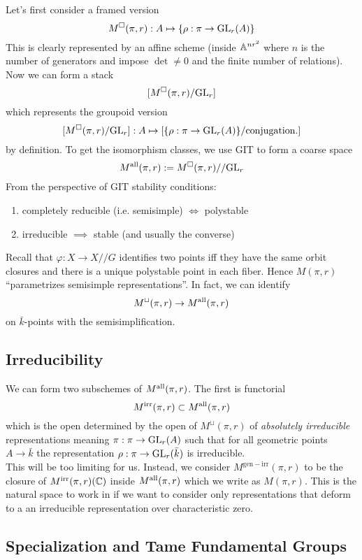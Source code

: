 \documentclass[12pt]{article}
\begin{document}
Let's first consider a framed version
\[ M^{\square}(\pi, r) : A \mapsto \{ \rho : \pi \to \mathrm{GL}_r(A) \} \]
This is clearly represented by an affine scheme (inside $\mathbb{A}^{nr^2}$ where $n$ is the number of generators and impose $\det \neq 0$ and the finite number of relations). Now we can form a stack
\[ [M^{\square}(\pi, r) / \mathrm{GL}_r] \]
which represents the groupoid version
\[ [M^{\square}(\pi, r) / \mathrm{GL}_r] : A \mapsto [\{ \rho : \pi \to \mathrm{GL}_r(A) \} / \text{conjugation}.] \]
by definition. To get the isomorphism classes, we use GIT to form a coarse space
\[ M^{\mathrm{all}}(\pi, r) := M^{\square}(\pi, r) // \mathrm{GL}_r \]
From the perspective of GIT stability conditions:
\begin{enumerate}
\item completely reducible (i.e. semisimple) $\iff$ polystable
\item irreducible $\implies$ stable (and usually the converse)
\end{enumerate}
Recall that $\varphi : X \to X // G$ identifies two points iff they have the same orbit closures and there is a unique polystable point in each fiber. Hence $M(\pi, r)$ ``parametrizes semisimple representations''. In fact, we can identify 
\[ M^{\sqcup}(\pi, r) \to M^{\mathrm{all}}(\pi, r) \]
on $\bar{k}$-points with the semisimplification. 

\subsection{Irreducibility}

\newcommand{\irr}{\mathrm{irr}}

We can form two subschemes of $M^{\mathrm{all}}(\pi, r)$. The first is functorial
\[ M^{\irr}(\pi, r) \subset M^{\all}(\pi, r) \]
which is the open determined by the open of $M^{\sqcup}(\pi, r)$ of \textit{absolutely irreducible} representations meaning $\pi : \pi \to \mathrm{GL}_r(A)$ such that for all geometric points $A \to \bar{k}$ the representation $\rho : \pi \to \mathrm{GL}_r(\bar{k})$ is irreducible. 
\bigskip\\
This will be too limiting for us. Instead, we consider $M^{\mathrm{gen-irr}}(\pi, r)$ to be the closure of $M^{\irr}(\pi, r)(\CC)$ inside $M^{\mathrm{all}}(\pi, r)$ which we write as $M(\pi, r)$. This is the natural space to work in if we want to consider only representations that deform to a an irreducible representation over characteristic zero. 

\subsection{Specialization and Tame Fundamental Groups}
\end{document}
